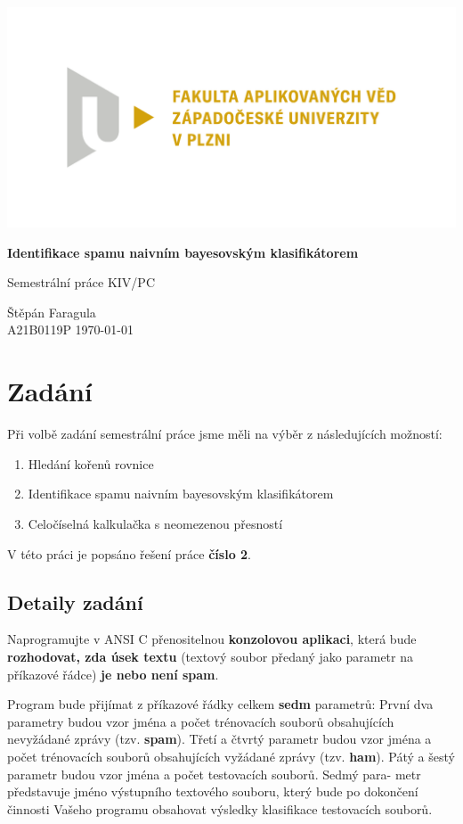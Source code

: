 \documentclass[12pt]{report}
\begin{document}
	
	\begin{titlepage}
		\centering
		\Large
		
		\includegraphics[width=.7\textwidth]{fav}
		
		\vspace{15mm}
		{\Huge\bfseries Identifikace spamu naivním bayesovským klasifikátorem}
		
		\vspace{15mm}
		{\LARGE Semestrální práce KIV/PC}
		
		\vfill
		\raggedright
		Štěpán Faragula\\
		A21B0119P
		\hfill 
		\today
	\end{titlepage}
	
	\tableofcontents

	\chapter{Zadání}
	Při volbě zadání semestrální práce jsme měli na výběr z následujících možností:
		
	\begin{enumerate}
		\item Hledání kořenů rovnice
		\item Identifikace spamu naivním bayesovským klasifikátorem
		\item Celočíselná kalkulačka s neomezenou přesností
	\end{enumerate}
		
	V této práci je popsáno řešení práce \textbf{číslo 2}.
	
	\section{Detaily zadání}
	Naprogramujte v ANSI C přenositelnou \textbf{konzolovou aplikaci}, která bude \textbf{rozhodovat, zda úsek textu} (textový soubor předaný jako parametr na příkazové řádce) \textbf{je nebo není spam}.
	
	Program bude přijímat z příkazové řádky celkem \textbf{sedm} parametrů: První dva parametry budou vzor jména a počet trénovacích souborů obsahujících nevyžádané zprávy (tzv. \textbf{spam}). Třetí a čtvrtý parametr budou vzor jména a počet trénovacích souborů obsahujících vyžádané zprávy (tzv. \textbf{ham}). Pátý a šestý parametr budou vzor jména a počet testovacích souborů. Sedmý para- metr představuje jméno výstupního textového souboru, který bude po dokončení činnosti Vašeho	programu obsahovat výsledky klasifikace testovacích souborů.
	
\end{document}
